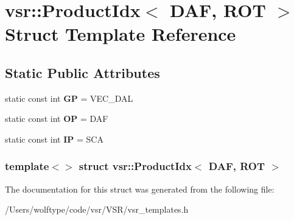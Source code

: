 \hypertarget{structvsr_1_1_product_idx_3_01_d_a_f_00_01_r_o_t_01_4}{\section{vsr\-:\-:Product\-Idx$<$ D\-A\-F, R\-O\-T $>$ Struct Template Reference}
\label{structvsr_1_1_product_idx_3_01_d_a_f_00_01_r_o_t_01_4}
}
\subsection*{Static Public Attributes}
\begin{DoxyCompactItemize}
\item 
\hypertarget{structvsr_1_1_product_idx_3_01_d_a_f_00_01_r_o_t_01_4_a37763fe76358099d9a0d960758ead673}{static const int {\bfseries G\-P} = V\-E\-C\-\_\-\-D\-A\-L}\label{structvsr_1_1_product_idx_3_01_d_a_f_00_01_r_o_t_01_4_a37763fe76358099d9a0d960758ead673}

\item 
\hypertarget{structvsr_1_1_product_idx_3_01_d_a_f_00_01_r_o_t_01_4_a3513e0a7b4917337e907eb143c044347}{static const int {\bfseries O\-P} = D\-A\-F}\label{structvsr_1_1_product_idx_3_01_d_a_f_00_01_r_o_t_01_4_a3513e0a7b4917337e907eb143c044347}

\item 
\hypertarget{structvsr_1_1_product_idx_3_01_d_a_f_00_01_r_o_t_01_4_a1aa5f6a41a602b6f292220c43b397b51}{static const int {\bfseries I\-P} = S\-C\-A}\label{structvsr_1_1_product_idx_3_01_d_a_f_00_01_r_o_t_01_4_a1aa5f6a41a602b6f292220c43b397b51}

\end{DoxyCompactItemize}
\subsubsection*{template$<$$>$ struct vsr\-::\-Product\-Idx$<$ D\-A\-F, R\-O\-T $>$}



The documentation for this struct was generated from the following file\-:\begin{DoxyCompactItemize}
\item 
/\-Users/wolftype/code/vsr/\-V\-S\-R/vsr\-\_\-templates.\-h\end{DoxyCompactItemize}
